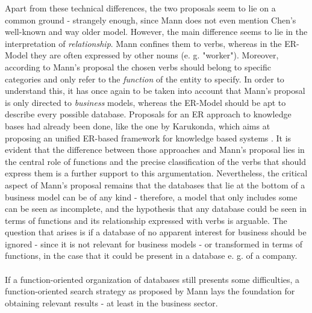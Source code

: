 Apart from these technical differences, the two proposals seem to lie on a common ground - strangely enough, since Mann does not even mention Chen's well-known and way older model. However, the main difference seems to lie in the interpretation of \textit{relationship}. Mann confines them to verbs, whereas in the ER-Model they are often expressed by other nouns (e. g. "worker"). Moreover, according to Mann's proposal the chosen verbs should belong to specific categories and only refer to the \textit{function} of the entity to specify. In order to understand this, it has once again to be taken into account that Mann's proposal is only directed to \textit{business} models, whereas the ER-Model should be apt to describe every possible database. Proposals for an ER approach to knowledge bases had already been done, like the one by Karukonda, which aims at proposing an unified ER-based framework for knowledge based systems \cite{karukonda}. It is evident that the difference between those approaches and Mann's proposal lies in the central role of functions and the precise classification of the verbs that should express them is a further support to this argumentation. Nevertheless, the critical aspect of Mann's proposal remains that the databases that lie at the bottom of a business model can be of any kind - therefore, a model that only includes some can be seen as incomplete, and the hypothesis that any database could be seen in terms of functions and its relationship expressed with verbs is arguable. The question that arises is if a database of no apparent interest for business should be ignored - since it is not relevant for business models - or transformed in terms of functions, in the case that it could be present in a database e. g. of a company.\\
\\
If a function-oriented organization of databases still presents some difficulties, a function-oriented search strategy as proposed by Mann lays the foundation for obtaining relevant results - at least in the business sector. \newpage
